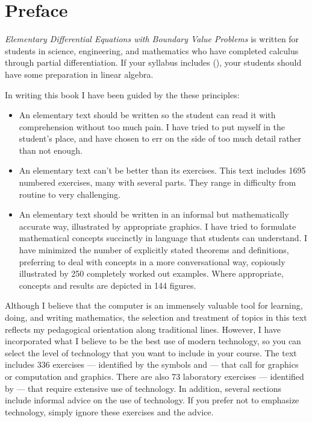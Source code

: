 
\setlength{\parindent}{10pt}

\chapter*[Preface]{Preface}

\emph{\color{blue}Elementary Differential Equations with Boundary Value Problems}
 is
written for students in science, engineering, and mathematics who have
completed calculus  through partial  differentiation. If  your syllabus
includes  (),
your students should have some preparation in linear algebra.

In writing this book I have been guided by the these principles:

\begin{itemize}

\item An elementary text should be written so  the student can
read it with comprehension without too much pain. I have tried to
put myself in the student's place, and have chosen to err on the side
of too much detail rather than not enough.

\item An elementary text can't be better than its exercises.
This text includes  1695 numbered exercises, many with several parts.
They range in difficulty from routine to very challenging.

\item An elementary text should be written in an informal but
mathematically accurate way, illustrated by appropriate graphics.
I have tried to formulate
mathematical concepts succinctly
 in language that students can understand. I have
minimized the number of explicitly stated theorems and definitions,
preferring to deal with concepts in a more conversational way,
copiously illustrated by 250 completely worked out examples. Where
appropriate, concepts and results are depicted in 144 figures.
\end{itemize}

Although I believe that the computer is an immensely valuable tool for
learning, doing, and writing mathematics, the selection and treatment
of topics in this text reflects my pedagogical orientation along
traditional lines. However, I have incorporated what I believe to be
the best use of modern technology, so you can select the level of
technology that you want to include in your course. The text includes
336 exercises --- identified by the symbols \Cex  and \CGex --- that call
for graphics or computation and graphics. There are also
73 laboratory exercises --- identified by \Lex --- that require extensive
use of technology. In addition, several sections include informal advice on
the use of technology. If you prefer not to emphasize technology,
simply ignore these exercises and the  advice.

